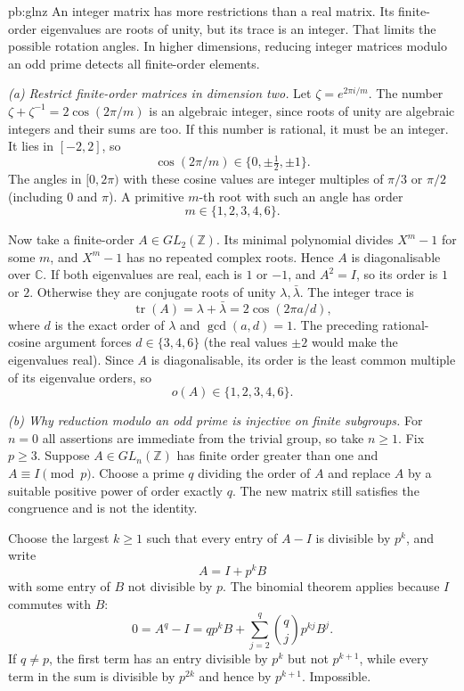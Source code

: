 \begin{solution}{pb:glnz}
\idea An integer matrix has more restrictions than a real matrix. Its finite-order eigenvalues are roots of unity, but its trace is an integer. That limits the possible rotation angles. In higher dimensions, reducing integer matrices modulo an odd prime detects all finite-order elements.

\writeup \emph{(a) Restrict finite-order matrices in dimension two.}
Let $\zeta=e^{2\pi i/m}$. The number $\zeta+\zeta^{-1}=2\cos(2\pi/m)$ is an algebraic integer, since roots of unity are algebraic integers and their sums are too. If this number is rational, it must be an integer. It lies in $[-2,2]$, so
\[
\cos(2\pi/m)\in\{0,\pm\tfrac12,\pm1\}.
\]
The angles in $[0,2\pi)$ with these cosine values are integer multiples of $\pi/3$ or $\pi/2$ (including $0$ and $\pi$). A primitive $m$-th root with such an angle has order
\[
\boxed{m\in\{1,2,3,4,6\}}.
\]

Now take a finite-order $A\in GL_2(\mathbb Z)$. Its minimal polynomial divides $X^m-1$ for some $m$, and $X^m-1$ has no repeated complex roots. Hence $A$ is diagonalisable over $\mathbb C$. If both eigenvalues are real, each is $1$ or $-1$, and $A^2=I$, so its order is $1$ or $2$. Otherwise they are conjugate roots of unity $\lambda,\bar\lambda$. The integer trace is
\[
\operatorname{tr}(A)=\lambda+\bar\lambda
=2\cos(2\pi a/d),
\]
where $d$ is the exact order of $\lambda$ and $\gcd(a,d)=1$. The preceding rational-cosine argument forces $d\in\{3,4,6\}$ (the real values $\pm2$ would make the eigenvalues real). Since $A$ is diagonalisable, its order is the least common multiple of its eigenvalue orders, so
\[
\boxed{o(A)\in\{1,2,3,4,6\}}.
\]

\emph{(b) Why reduction modulo an odd prime is injective on finite subgroups.}
For $n=0$ all assertions are immediate from the trivial group, so take $n\ge1$. Fix $p\ge3$. Suppose $A\in GL_n(\mathbb Z)$ has finite order greater than one and $A\equiv I\pmod p$. Choose a prime $q$ dividing the order of $A$ and replace $A$ by a suitable positive power of order exactly $q$. The new matrix still satisfies the congruence and is not the identity.

Choose the largest $k\ge1$ such that every entry of $A-I$ is divisible by $p^k$, and write
\[
A=I+p^kB
\]
with some entry of $B$ not divisible by $p$. The binomial theorem applies because $I$ commutes with $B$:
\[
0=A^q-I=qp^kB+
\sum_{j=2}^q\binom qj p^{kj}B^j.
\]
If $q\ne p$, the first term has an entry divisible by $p^k$ but not $p^{k+1}$, while every term in the sum is divisible by $p^{2k}$ and hence by $p^{k+1}$. Impossible.


\end{solution}
